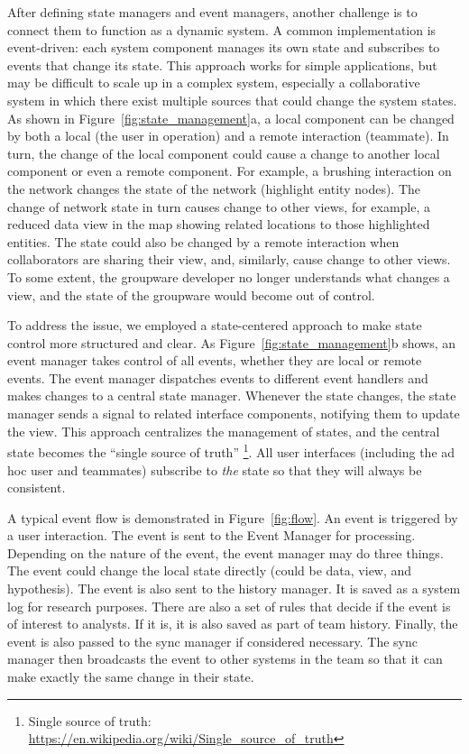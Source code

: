 After defining state managers and event managers, another challenge is to connect them to function as a dynamic system. A common implementation is event-driven:
each system component manages its own state and subscribes to events that change its state. This approach works for simple applications, but may be difficult to scale up in a complex system, especially a collaborative system in which there exist multiple sources that could change the system states. As shown in Figure~\ref{fig:state_management}a, a local
component can be changed by both a local (the user in operation) and a remote interaction (teammate). In turn, the
change of the local component could cause a change to another local component or
even a remote component. For example, a brushing interaction on the network changes
the state of the network (highlight entity nodes). The change of network state
in turn causes change to other views, for example, a reduced data view in the
map showing related locations to those highlighted entities. The state could
also be changed by a remote interaction when collaborators are sharing their
view, and, similarly, cause change to other views. To some extent, the groupware
developer no longer understands what changes a view, and the state of the
groupware would become out of control.

To address the issue, we employed a state-centered approach to make state control more structured and
clear. As Figure~\ref{fig:state_management}b shows, an event manager takes control of all events, whether
they are local or remote events. The event manager dispatches events to
different event handlers and makes changes to a central state manager. Whenever
the state changes, the state manager sends a signal to related interface
components, notifying them to update the view. This approach centralizes the
management of states, and the central state becomes the ``single source of truth'' \footnote{Single source of truth: \url{https://en.wikipedia.org/wiki/Single_source_of_truth}}. 
All user interfaces (including the ad hoc user and teammates) subscribe to \emph{the} state so that they will always be consistent. 

A typical event flow is demonstrated in Figure~\ref{fig:flow}. An event is triggered by a user
interaction. The event is sent to the Event Manager for processing. Depending on the nature of the event, the event manager may do three things. The event could change the local state directly (could be data, view, and hypothesis). The event is also sent to the history manager. It is saved as a system log for research purposes. There are also a set of rules that decide if the event is of interest to analysts. If it is, it is also saved as part of team history. Finally, the event is also passed to the sync manager if considered necessary. The sync manager then broadcasts the event to other systems in the team so that it can make exactly the same change in their state. 



